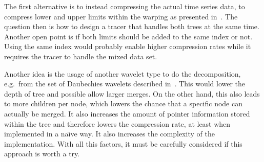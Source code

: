 The first alternative is to instead compressing the actual time series data, to compress lower and upper limits within the warping as presented in~\cite{LB_Keogh}. The question then is how to design a tracer that handles both trees at the same time. Another open point is if both limits should be added to the same index or not. Using the same index would probably enable higher compression rates while it requires the tracer to handle the mixed data set.

Another idea is the usage of another wavelet type to do the decomposition, e.g.\ from the set of Daubechies wavelets described in~\cite{daubechies}. This would lower the depth of tree and possible allow larger merges. On the other hand, this also leads to more children per node, which lowers the chance that a specific node can actually be merged. It also increases the amount of pointer information stored within the tree and therefore lowers the compression rate, at least when implemented in a na{\"\i}ve way. It also increases the complexity of the implementation. With all this factors, it must be carefully considered if this approach is worth a try.

